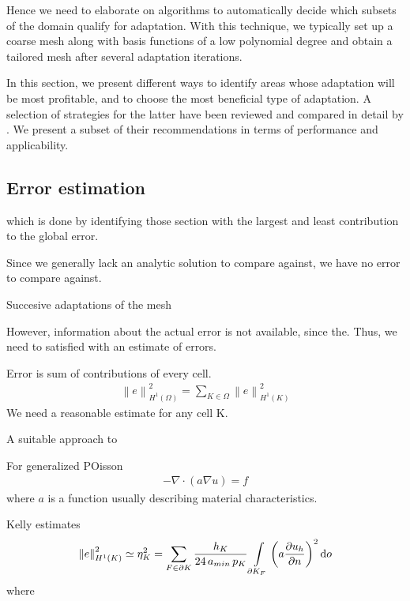 Hence we need to elaborate on algorithms to automatically decide which subsets of the domain qualify for adaptation. With this technique, we typically set up a coarse mesh along with basis functions of a low polynomial degree and obtain a tailored mesh after several adaptation iterations.

In this section, we present different ways to identify areas whose adaptation will be most profitable, and to choose the most beneficial type of adaptation. A selection of strategies for the latter have been reviewed and compared in detail by \textcite{mitchell2014}. We present a subset of their recommendations in terms of performance and applicability.

\subsection{Error estimation}
\label{ssec:estimation}

which is done by identifying those section with the largest and least contribution to the global error.

Since we generally lack an analytic solution to compare against, we have no error to compare against.

Succesive adaptations of the mesh

However, information about the actual error is not available, since the. Thus, we need to satisfied with an estimate of errors.

Error is sum of contributions of every cell.
\begin{align}
\label{eq:Kelly} \left\|e\right\|_{H^1(\Omega)}^2 = \sum\limits_{K \in \Omega} \left\|e\right\|_{H^1(K)}^2
\end{align}
We need a reasonable estimate for any cell K.

A suitable approach to \cite{kelly1983}

For generalized POisson
\begin{align}
-\nabla \cdot \left( a \nabla u \right) = f
\end{align}
where $a$ is a function usually describing material characteristics.

Kelly estimates
\begin{align}
\label{eq:Kelly2} \left\|e\right\|_{H^1(K)}^2 \simeq \eta_K^2 = \sum\limits_{F \in \partial K} \frac{h_K}{24 \, a_{min} \, p_K} \int\limits_{\partial K_{F}} \left( a \frac{\partial u_h}{\partial n} \right)^2 \mathop{}\!\mathrm{d}o
\end{align}
where

